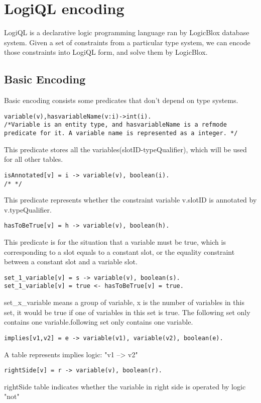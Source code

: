 \documentclass[11pt]{article}
\begin{document}
\section{LogiQL encoding}
LogiQL is a declarative logic programming language ran by LogicBlox database system. Given a set of constraints from a particular type system, we can encode those constraints into LogiQL form, and solve them by LogicBlox.
\subsection{Basic Encoding} 
Basic encoding consists some predicates that don't depend on type systems.
\begin{lstlisting}
variable(v),hasvariableName(v:i)->int(i).
/*Variable is an entity type, and hasvariableName is a refmode predicate for it. A variable name is represented as a integer. */ 
\end{lstlisting}
This predicate stores all the variables(slotID-typeQualifier), which will be used for all other tables. 

\begin{lstlisting}
isAnnotated[v] = i -> variable(v), boolean(i).
/* */ 
\end{lstlisting}
This predicate represents whether the constraint variable v.slotID is annotated by v.typeQualifier.

\begin{lstlisting}
hasToBeTrue[v] = h -> variable(v), boolean(h).
\end{lstlisting}
This predicate is for the situation that a variable must be true, which is corresponding to a slot equals to a constant slot, or the equality constraint between a constant slot and a variable slot.
\begin{lstlisting}
set_1_variable[v] = s -> variable(v), boolean(s).
set_1_variable[v] = true <- hasToBeTrue[v] = true.
\end{lstlisting}
set\_x\_variable means a group of variable, x is the number of variables in this set, it would be true if one of variables in this set is true. The following set only contains one variable.following set only contains one variable.

\begin{lstlisting}
implies[v1,v2] = e -> variable(v1), variable(v2), boolean(e).
\end{lstlisting}
A table represents implies logic: "v1 --> v2"

\begin{lstlisting}
rightSide[v] = r -> variable(v), boolean(r).
\end{lstlisting}
rightSide table indicates whether the variable in right side is operated by logic "not"


 \par 
\end{document}
